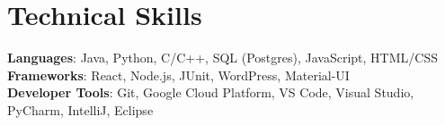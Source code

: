 \documentclass[letterpaper,11pt]{article}
\begin{document}
\section{Technical Skills}
 \begin{itemize}[leftmargin=0.15in, label={}]
    \small{\item{
     \textbf{Languages}{: Java, Python, C/C++, SQL (Postgres), JavaScript, HTML/CSS} \\
     \textbf{Frameworks}{: React, Node.js, JUnit, WordPress, Material-UI} \\
     \textbf{Developer Tools}{: Git, Google Cloud Platform, VS Code, Visual Studio, PyCharm, IntelliJ, Eclipse} \\
    }}
 \end{itemize}

\end{document}

